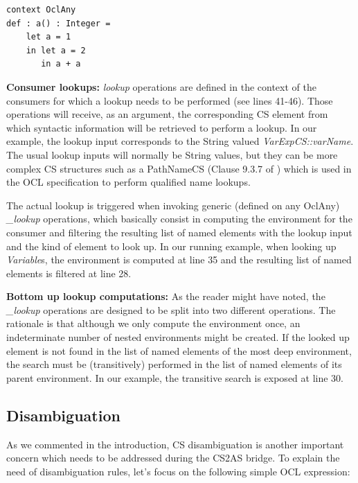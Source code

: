 \documentclass{llncs}
\begin{document}
\begin{lstlisting}[caption=LetExp variables occlude outer variables, label=lst:nestedEnvExample, language=OCL]
context OclAny
def : a() : Integer =
	let a = 1
	in let a = 2
	   in a + a
\end{lstlisting}
	   
\textbf{Consumer lookups:} \emph{lookup} operations are defined in the context of the consumers for which a lookup needs to be performed (see lines 41-46). Those operations will receive, as an argument, the corresponding CS element from which syntactic information will be retrieved to perform a lookup. In our example, the lookup input corresponds to the String valued \emph{VarExpCS::varName}. The usual lookup inputs will normally be String values, but they can be more complex CS structures such as a PathNameCS (Clause 9.3.7 of \cite{omg2013ocl}) which is used in the OCL specification to perform qualified name lookups. 

The actual lookup is triggered when invoking generic (defined on any OclAny) \emph{\_lookup} operations, which basically consist in computing the environment for the consumer and filtering the resulting list of named elements with the lookup input and the kind of element to look up. In our running example, when looking up \emph{Variable}s, the environment is computed at line 35 and the resulting list of named elements is filtered at line 28.

\textbf{Bottom up lookup computations:} As the reader might have noted, the \emph{\_lookup} operations are designed to be split into two different operations. The rationale is that although we only compute the environment once, an indeterminate number of nested environments might be created. If the looked up element is not found in the list of named elements of the most deep environment, the search must be (transitively) performed in the list of named elements of its parent environment. In our example, the transitive search is exposed at line 30.
\textbf{}

\subsection{Disambiguation}
\label{subsec:disamb}

As we commented in the introduction, CS disambiguation is another important concern which needs to be addressed during the CS2AS bridge. To explain the need of disambiguation rules, let's focus on the following simple OCL expression:
\end{document}

